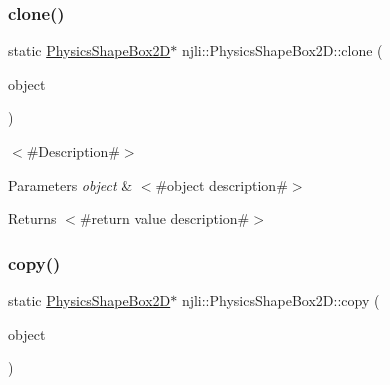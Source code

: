 \mbox{\label{classnjli_1_1_physics_shape_box2_d_a6a2976c0d404af777361ca4e20721b6a}} 
\subsubsection{\texorpdfstring{clone()}{clone()}}
{\footnotesize\ttfamily static \mbox{\hyperlink{classnjli_1_1_physics_shape_box2_d}{Physics\+Shape\+Box2D}}$\ast$ njli\+::\+Physics\+Shape\+Box2\+D\+::clone (\begin{DoxyParamCaption}\item[{const \mbox{\hyperlink{classnjli_1_1_physics_shape_box2_d}{Physics\+Shape\+Box2D}} \&}]{object }\end{DoxyParamCaption})\hspace{0.3cm}{\ttfamily [static]}}

$<$\#\+Description\#$>$


\begin{DoxyParams}{Parameters}
{\em object} & $<$\#object description\#$>$\\
\hline
\end{DoxyParams}
\begin{DoxyReturn}{Returns}
$<$\#return value description\#$>$ 
\end{DoxyReturn}
\mbox{\label{classnjli_1_1_physics_shape_box2_d_a83239f524d6261f9717e0ac238cddd00}} 
\subsubsection{\texorpdfstring{copy()}{copy()}}
{\footnotesize\ttfamily static \mbox{\hyperlink{classnjli_1_1_physics_shape_box2_d}{Physics\+Shape\+Box2D}}$\ast$ njli\+::\+Physics\+Shape\+Box2\+D\+::copy (\begin{DoxyParamCaption}\item[{const \mbox{\hyperlink{classnjli_1_1_physics_shape_box2_d}{Physics\+Shape\+Box2D}} \&}]{object }\end{DoxyParamCaption})\hspace{0.3cm}{\ttfamily [static]}}

